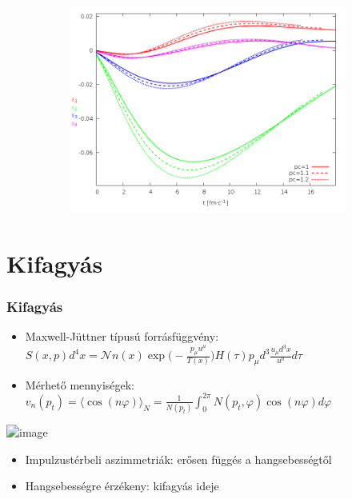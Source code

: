 \documentclass{beamer}
\begin{document}
\begin{frame}
\begin{center}
\begin{figure}[H]
\begin{subfigure}[b]{0.49\textwidth}
        	\includegraphics[width=\textwidth]{pic/res/rel/eps_pc_v}
	\end{subfigure}
\end{figure}
\end{center}
\end{frame}

\section{Kifagyás}
\begin{frame}
\frametitle{Kifagyás}
\begin{itemize}
\item<1-> Maxwell-Jüttner típusú forrásfüggvény: 
$S(x, p)d^4x=\mathcal{N}n(x)\exp{\bigg(-\frac{p_\mu u^\mu}{T(x)}\bigg)}H(\tau)p_\mu d^3\frac{u_\mu d^3x}{u^0} d\tau$
\item<2-> Mérhető mennyiségek:
$v_n(p_t)=\langle\cos(n\varphi)\rangle_{N}=\frac{1}{N(p_t)}\int_0^{2\pi} N(p_t, \varphi)\cos(n\varphi)d\varphi$
\end{itemize}
\begin{minipage}{0.49\textwidth}
\begin{center}
\includegraphics<2->[scale=0.23]{pic/res/rel/vn_kappa}
\end{center}
\end{minipage}
\begin{minipage}{0.5\textwidth}
\begin{itemize}
\item<2-> Impulzustérbeli aszimmetriák: erősen függés a hangsebességtől
\item<2-> Hangsebességre érzékeny: kifagyás ideje
\end{itemize}
\end{minipage}
\end{frame}
\end{document}
